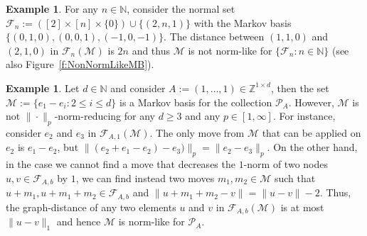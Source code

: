 \documentclass[11pt]{amsart}
\theoremstyle{definition}
\newtheorem{example}[thm]{Example}
\numberwithin{equation}{section}
\newcommand{\ring}[1]{\ensuremath{\mathbb{#1}}}
\renewcommand{\>}{\rangle}
\newcommand{\<}{\langle}
\newcommand{\0}{\mathbf{0}}
\newcommand{\1}{\mathbf{1}}
\newcommand{\2}{\mathbf{2}}
\newcommand\NN{\ring{N}}
\newcommand\ZZ{\ring{Z}}
\newcommand\cF{{\mathcal F}}
\newcommand\cM{{\mathcal M}}
\newcommand\cP{{\mathcal P}}
\newcommand{\fiber}[2]{\mathcal{F}_{#1,#2}}
\newcommand{\fibergraph}[3]{\mathcal{F}_{#1,#2}\left(#3\right)}
\begin{document}
\begin{example}\label{ex:NonNormLikeMB}
For any $n\in\NN$, consider the normal set
$\cF_n:=([2]\times[n]\times\{0\})\cup\{(2,n,1)\}$
with the Markov basis $\{(0,1,0),(0,0,1),(-1,0,-1)\}$.  The distance
between $(1,1,0)$ and $(2,1,0)$ in $\cF_n(\cM)$ is $2n$ and thus $\cM$ is
not norm-like for $\{\cF_n:n\in\NN\}$ (see also
Figure~\ref{f:NonNormLikeMB}).
\end{example}

\begin{example}\label{ex:NonNormReducingNormLike}
Let $d\in\NN$ and consider $A:=(1,\dots,1)\in\ZZ^{1\times d}$, then the
set $\cM:=\{e_1-e_i: 2\le i\le d\}$ is a Markov basis for
the collection $\cP_{A}$. However, $\cM$ is not
$\|\cdot\|_p$-norm-reducing for any $d\ge
3$ and any $p\in[1,\infty]$. For
instance, consider $e_2$ and $e_3$ in
$\fibergraph{A}{1}{\cM}$. The only move from $\cM$ that can be applied
on $e_2$ is $e_1-e_2$, but $\|(e_2+e_1-e_2)-e_3)\|_p=\|e_2-e_3\|_p$.
On the other hand,
in the case we cannot find a move that decreases the
$1$-norm of two nodes $u,v\in\fiber{A}{b}$ by $1$, we can
find instead two moves $m_1,m_2\in\cM$ such that
$u+m_1,u+m_1+m_2\in\fiber{A}{b}$ and $\|u+m_1+m_2-v\|=\|u-v\|-2$.
Thus, the graph-distance of any two elements $u$ and $v$ in
$\fibergraph{A}{b}{\cM}$ is at most $\|u-v\|_1$ and hence $\cM$ is
norm-like for $\cP_A$.
\end{example}
\end{document}
